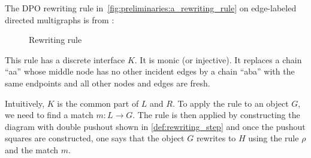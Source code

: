 \begin{example}
  \label{ex:grsaa}
  The DPO rewriting rule in~\autoref{fig:preliminaries:a_rewriting_rule} on edge-labeled directed multigraphs is from \cite[Example 6]{bruggink2014termination}:
  \begin{figure}[!ht]
      \centering 
      \caption{Rewriting rule}
      \label{fig:preliminaries:a_rewriting_rule}
  \end{figure}
  This rule has a discrete interface \( K \). It is monic (or injective). It replaces a chain \enquote{aa} whose middle node has no other incident edges by a chain \enquote{aba} with the same endpoints and all other nodes and edges are fresh. 
\end{example}


Intuitively, $K$ is the common part of $L$ and $R$. To apply the rule to an object $G$, we need to find a match $m:L \to G$. The rule is then applied by constructing the diagram with double pushout shown in \autoref{def:rewriting_step} and once the pushout squares are constructed, one says that the object $G$ rewrites to $H$ using the rule $\rho$ and the match $m$. 

